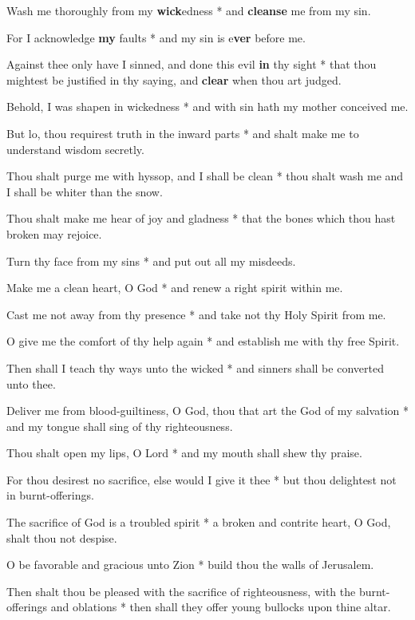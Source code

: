 \begin{multicols}{2}
	Wash me thoroughly from my \textbf{wick}edness * and \textbf{cleanse} me from my sin.
	
	For I acknowledge \textbf{my} faults * and my sin is e\textbf{ver} before me.
	
	Against thee only have I sinned, and done this evil \textbf{in} thy sight * that thou mightest be justified in thy saying, and \textbf{clear} when thou art judged.
	
	Behold, I was shapen in wickedness * and with sin hath my mother conceived me.
	
	But lo, thou requirest truth in the inward parts * and shalt make me to understand wisdom secretly.
	
	Thou shalt purge me with hyssop, and I shall be clean * thou shalt wash me and I shall be whiter than the snow.
	
	Thou shalt make me hear of joy and gladness * that the bones which thou hast broken may rejoice.
	
	Turn thy face from my sins * and put out all my misdeeds.
	
	Make me a clean heart, O God * and renew a right spirit within me.
	
	Cast me not away from thy presence * and take not thy Holy Spirit from me.
	
	O give me the comfort of thy help again * and establish me with thy free Spirit.
	
	Then shall I teach thy ways unto the wicked * and sinners shall be converted unto thee.
	
	Deliver me from blood-guiltiness, O God, thou that art the God of my salvation * and my tongue shall sing of thy righteousness.
	
	Thou shalt open my lips, O Lord * and my mouth shall shew thy praise.
	
	For thou desirest no sacrifice, else would I give it thee * but thou delightest not in burnt-offerings.
	
	The sacrifice of God is a troubled spirit * a broken and contrite heart, O God, shalt thou not despise.
	
	O be favorable and gracious unto Zion * build thou the walls of Jerusalem.
	
	Then shalt thou be pleased with the sacrifice of righteousness, with the burnt-offerings and oblations * then shall they offer young bullocks upon thine altar.
	
\end{multicols}
